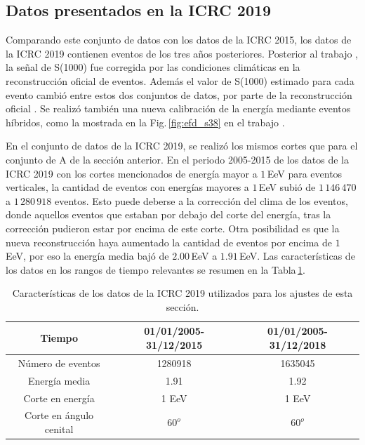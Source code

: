  \subsection{Datos presentados en la ICRC 2019}\label{conjuntoB}

     Comparando este conjunto de datos con los datos de la ICRC 2015, los datos de la ICRC 2019 contienen eventos de los tres años posteriores. Posterior al trabajo \cite{aab2017impact}, la señal de S(1000) fue corregida por las condiciones climáticas en la reconstrucción oficial de eventos. Además el valor de S(1000) estimado para cada evento cambió entre estos dos conjuntos de datos, por parte de la reconstrucción oficial \cite{isabel}. Se realizó también una nueva calibración de la energía mediante eventos híbridos, como la mostrada en la Fig.\,\ref{fig:efd_s38} en el trabajo  \cite{tobepublished}. 
     
     En el conjunto de datos de la ICRC 2019, se realizó los mismos cortes que para el conjunto de A de la sección anterior. En el periodo 2005-2015 de los datos de la ICRC 2019 con los cortes mencionados de energía mayor a $1\,$EeV para eventos verticales, la cantidad de eventos con energías mayores a $1\,$EeV subió de $1\,146\,470$ a  $1\,280\,918$ eventos. Esto puede deberse a la corrección del clima de los eventos, donde aquellos eventos que estaban por debajo del corte del energía, tras la corrección pudieron estar por encima de este corte. Otra posibilidad es que la nueva reconstrucción haya aumentado la cantidad de eventos por encima de $1\,$EeV, por eso la energía media bajó de $2.00\,$EeV a $1.91\,$EeV.  Las características de los datos en los rangos de tiempo relevantes se resumen en la Tabla\,\ref{tabla:caracteristicas_ICRC_2019}. 

        \begin{table}[H]
            \centering
            \begin{tabular}{|c|c|c|}
            {Tiempo }           & {01/01/2005-31/12/2015}   & {01/01/2005-31/12/2018 }\\ \hline 
            Número de eventos   &  1280918     			    &  1635045     		        \\ \hline 
            Energía media       &  1.91				        &	1.92				        \\ \hline 
            Corte en energía    &  1 EeV       		 	    &  1 EeV       		 \\ \hline 
            Corte en ángulo cenital	&  $60^o$ 				    & $60^o$\\ 
            \end{tabular}
            \caption{Características de los datos de la ICRC 2019 utilizados para los ajustes de esta sección.} \label{tabla:caracteristicas_ICRC_2019}
        \end{table}

